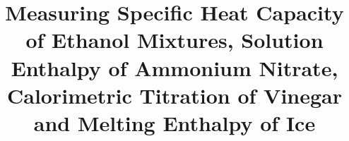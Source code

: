 \title{Measuring Specific Heat Capacity of Ethanol Mixtures, Solution Enthalpy of Ammonium Nitrate, Calorimetric Titration of Vinegar and Melting Enthalpy of Ice}



\abstract{}